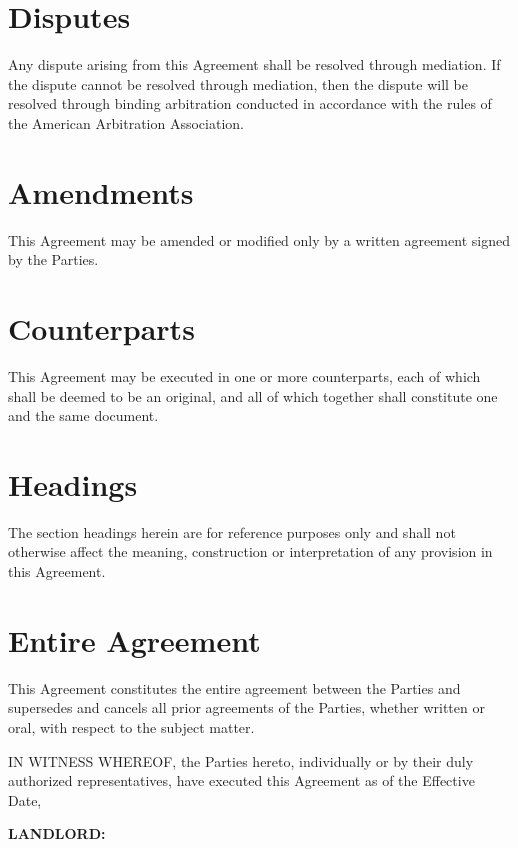 \documentclass[12pt]{article}
\begin{document}
{\section{Disputes}
Any dispute arising from this Agreement shall be resolved through mediation. If the dispute
cannot be resolved through mediation, then the dispute will be resolved through binding
arbitration conducted in accordance with the rules of the American Arbitration Association.

\section{Amendments}
This Agreement may be amended or modified only by a written agreement signed by the Parties.

\section{Counterparts}
This Agreement may be executed in one or more counterparts, each of which shall be deemed to
be an original, and all of which together shall constitute one and the same document.

\section{Headings}
The section headings herein are for reference purposes only and shall not otherwise affect the
meaning, construction or interpretation of any provision in this Agreement.

\section{Entire Agreement}
This Agreement constitutes the entire agreement between the Parties and supersedes and cancels
all prior agreements of the Parties, whether written or oral, with respect to the subject
matter.

\vspace{2em}

\begin{minipage}{\textwidth}
IN WITNESS WHEREOF, the Parties hereto, individually or by their duly authorized
representatives, have executed this Agreement as of the Effective Date, %

\vspace{2em}

\textbf{LANDLORD:} %

\vspace{3.5em}


\end{minipage}}
\end{document}
